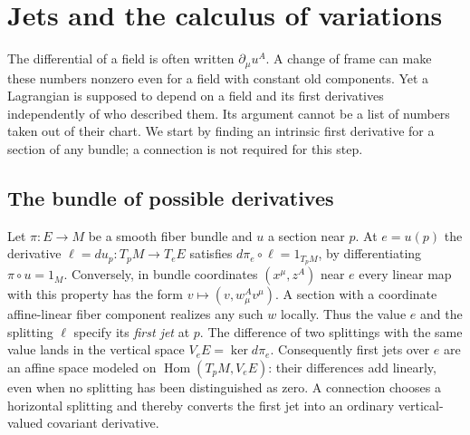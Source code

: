 \chapter{Jets and the calculus of variations}\label{f:variation}
The differential of a field is often written $\partial_\mu u^A$. A change of frame can make these numbers nonzero even for a field with constant old components. Yet a Lagrangian is supposed to depend on a field and its first derivatives independently of who described them. Its argument cannot be a list of numbers taken out of their chart. We start by finding an intrinsic first derivative for a section of any bundle; a connection is not required for this step.

\section{The bundle of possible derivatives}\label{f:jet}
Let $\pi:E\to M$ be a smooth fiber bundle and $u$ a section near $p$. At $e=u(p)$ the derivative $\ell=du_p:T_pM\to T_eE$ satisfies $d\pi_e\circ\ell=1_{T_pM}$, by differentiating $\pi\circ u=1_M$. Conversely, in bundle coordinates $(x^\mu,z^A)$ near $e$ every linear map with this property has the form $v\mapsto(v,w^A_\mu v^\mu)$. A section with a coordinate affine-linear fiber component realizes any such $w$ locally. Thus the value $e$ and the splitting $\ell$ specify its \emph{first jet} at $p$. The difference of two splittings with the same value lands in the vertical space $V_eE=\ker d\pi_e$. Consequently first jets over $e$ are an affine space modeled on $\operatorname{Hom}(T_pM,V_eE)$: their differences add linearly, even when no splitting has been distinguished as zero. A connection chooses a horizontal splitting and thereby converts the first jet into an ordinary vertical-valued covariant derivative.

